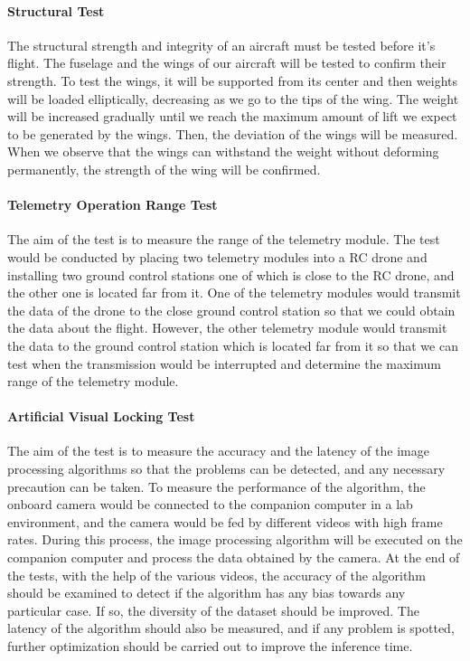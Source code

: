 \documentclass[12pt]{article}
\begin{document}
\paragraph*{Structural Test} The structural strength and integrity of an aircraft must be tested before it’s flight. The fuselage and the wings of our aircraft will be tested to confirm their strength. To test the wings, it will be supported from its center and then weights will be loaded elliptically, decreasing as we go to the tips of the wing. The weight will be increased gradually until we reach the maximum amount of lift we expect to be generated by the wings. Then, the deviation of the wings will be measured. When we observe that the wings can withstand the weight without deforming permanently, the strength of the wing will be confirmed.

\paragraph*{Telemetry Operation Range Test} The aim of the test is to measure the range of the telemetry module. The test would be conducted by placing two telemetry modules into a RC drone and installing two ground control stations one of which is close to the RC drone, and the other one is located far from it. One of the telemetry modules would transmit the data of the drone to the close ground control station so that we could obtain the data about the flight. However, the other telemetry module would transmit the data to the ground control station which is located far from it so that we can test when the transmission would be interrupted and determine the maximum range of the telemetry module.

\paragraph*{Artificial Visual Locking Test} The aim of the test is to measure the accuracy and the latency of the image processing algorithms so that the problems can be detected, and any necessary precaution can be taken. To measure the performance of the algorithm, the onboard camera would be connected to the companion computer in a lab environment, and the camera would be fed by different videos with high frame rates. During this process, the image processing algorithm will be executed on the companion computer and process the data obtained by the camera. At the end of the tests, with the help of the various videos, the accuracy of the algorithm should be examined to detect if the algorithm has any bias towards any particular case. If so, the diversity of the dataset should be improved. The latency of the algorithm should also be measured, and if any problem is spotted, further optimization should be carried out to improve the inference time. 
\end{document}
